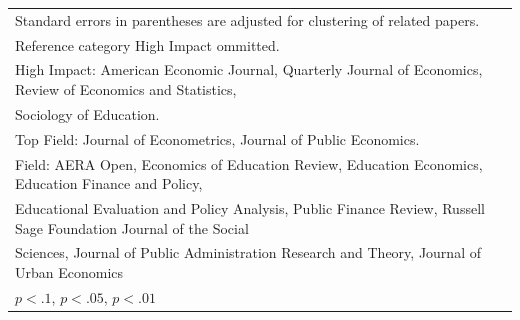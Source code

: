 \begin{table}[htbp]
\begin{tabular}{l*{4}{c}}
\hline\hline
\multicolumn{5}{l}{\footnotesize Standard errors in parentheses are adjusted for clustering of related papers.}\\
\multicolumn{5}{l}{\footnotesize Reference category High Impact ommitted.}\\
\multicolumn{5}{l}{\footnotesize High Impact: American Economic Journal, Quarterly Journal of Economics, Review of Economics and Statistics,}\\
\multicolumn{5}{l}{\footnotesize Sociology of Education.}\\
\multicolumn{5}{l}{\footnotesize Top Field: Journal of Econometrics, Journal of Public Economics.}\\
\multicolumn{5}{l}{\footnotesize Field: AERA Open, Economics of Education Review, Education Economics, Education Finance and Policy,}\\
\multicolumn{5}{l}{\footnotesize Educational Evaluation and Policy Analysis, Public Finance Review, Russell Sage Foundation Journal of the Social}\\
\multicolumn{5}{l}{\footnotesize Sciences, Journal of Public Administration Research and Theory, Journal of Urban Economics}\\
\multicolumn{5}{l}{\footnotesize \footnotesize \sym{*} \(p<.1\), \sym{**} \(p<.05\), \sym{***} \(p<.01\)}\\
\end{tabular}
\end{table}
